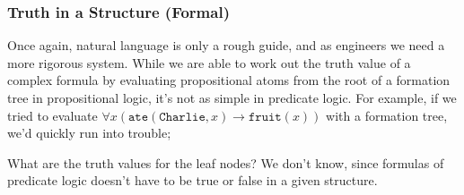 \documentclass[a4paper, 12pt]{article}
\begin{document}
            \subsubsection*{Truth in a Structure (Formal)}
                Once again, natural language is only a rough guide, and as engineers we need a more rigorous system. While we are able to work out the truth value of a complex formula by evaluating propositional atoms from the root of a formation tree in propositional logic, it's not as simple in predicate logic. For example, if we tried to evaluate $\forall x (\texttt{ate}(\texttt{Charlie}, x) \rightarrow \texttt{fruit}(x))$ with a formation tree, we'd quickly run into trouble;
                \begin{center}
                \end{center}
                What are the truth values for the leaf nodes? We don't know, since formulas of predicate logic doesn't have to be true or false in a given structure.
                \medskip
\end{document}
